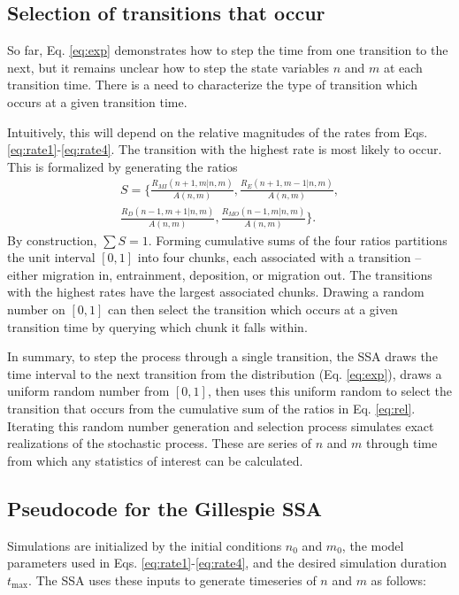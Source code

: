 \subsection{Selection of transitions that occur}
\label{sec:brr}
So far, Eq. \ref{eq:exp} demonstrates how to step the time from one transition to the next, but it remains unclear how to step the state variables $n$ and $m$ at each transition time. There is a need to characterize the type of transition which occurs at a given transition time.

Intuitively, this will depend on the relative magnitudes of the rates from Eqs. \ref{eq:rate1}-\ref{eq:rate4}.
The transition with the highest rate is most likely to occur.
This is formalized by generating the ratios
\begin{multline} S = \Bigg\{\frac{R_{MI}(n+1,m|n,m)}{ A(n,m)},
	\frac{R_E(n+1,m-1|n,m)}{ A(n,m)},\\
	\frac{R_D(n-1,m+1|n,m)}{ A(n,m)},
	\frac{R_{MO}(n-1,m|n,m)}{ A(n,m)}\Bigg\}. \label{eq:rel} \end{multline}
By construction, $\sum S=1$.
Forming cumulative sums of the four ratios partitions the unit interval $[0,1]$ into four chunks, each associated with a transition -- either migration in, entrainment, deposition, or migration out. The transitions with the highest rates have the largest associated chunks. Drawing a random number on $[0,1]$ can then select the transition which occurs at a given transition time by querying which chunk it falls within.

In summary, to step the process through a single transition, the SSA draws the time interval to the next transition from the distribution (Eq. \ref{eq:exp}), draws a uniform random number from $[0,1]$, then uses this uniform random to select the transition that occurs from the cumulative sum of the ratios in Eq. \ref{eq:rel}. Iterating this random number generation and selection process simulates exact realizations of the stochastic process. These are series of $n$ and $m$ through time from which any statistics of interest can be calculated.

\subsection{Pseudocode for the Gillespie SSA}
\label{sec:crr}
Simulations are initialized by the initial conditions $n_0$ and $m_0$, the model parameters used in Eqs. \ref{eq:rate1}-\ref{eq:rate4}, and the desired simulation duration $t_\text{max}$. The SSA uses these inputs to generate timeseries of $n$ and $m$ as follows:

